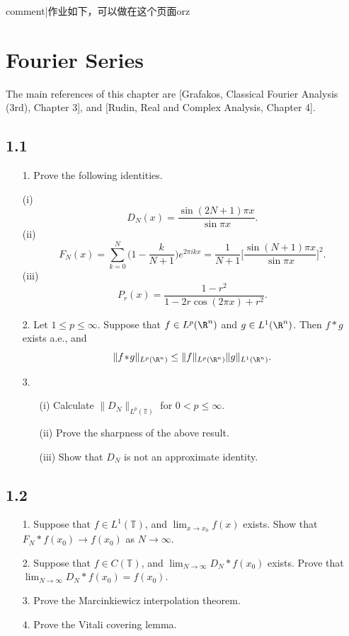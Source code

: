 \newcommand{\T}{\mathbb{T}}

{{comment|作业如下，可以做在这个页面orz}}

\section{Fourier Series}
The main references of this chapter are [Grafakos, Classical Fourier Analysis
(3rd), Chapter 3], and [Rudin, Real and Complex Analysis, Chapter 4].

\subsection*{1.1}
\begin{itemize}
    \item[1.]Prove the following identities.

    (i)$$D_N(x)=\frac{\sin(2N+1)\pi x}{\sin \pi x}.$$
    (ii)$$F_N(x)=\sum_{k=0}^N\big(1-{\textstyle \frac{k}{N+1}}\big)e^{2\pi ikx}
    =\frac{1}{N+1}\Big[\frac{\sin(N+1)\pi x}{\sin \pi x}\Big]^2.$$
    (iii)$$P_r(x)=\frac{1-r^2}{1-2r\cos(2\pi x)+r^2}.$$ 

    \item[2.]Let $1\le p\le\infty$. Suppose that $f\in L^p(\R^n)$ and $g\in L^1(\R^n)$.
    Then $f\!*\!g$ exists a.e., and
    $$\|f\!*\!g\|_{L^p(\R^n)}\le\|f\|_{L^p(\R^n)}\|g\|_{L^1(\R^n)}.$$

    \item[3.]\begin{itemize}
        \item[(i)]Calculate $\|D_N\|_{L^p(\T)}$ for $0<p\le\infty$.\\
        \item[(ii)]Prove the sharpness of the above result.\\
        \item[(iii)]Show that $D_N$ is not an approximate identity.
        \end{itemize}
\end{itemize}
\subsection*{1.2}
\begin{itemize}
    \item[1.]Suppose that $f\in L^1(\T)$, and $\lim_{x\to x_0}f(x)$ exists.
    Show that $F_N\!*\!f(x_0)\to f(x_0)$ as $N\to\infty$.

    \item[2.]Suppose that $f\in C(\T)$, and $\lim_{N\to\infty}D_N\!*\!f(x_0)$ exists.
    Prove that $\lim_{N\to\infty}D_N\!*\!f(x_0)=f(x_0)$.

    \item[3.]Prove the Marcinkiewicz interpolation theorem.
    
    \item[4.]Prove the Vitali covering lemma.
\end{itemize}
